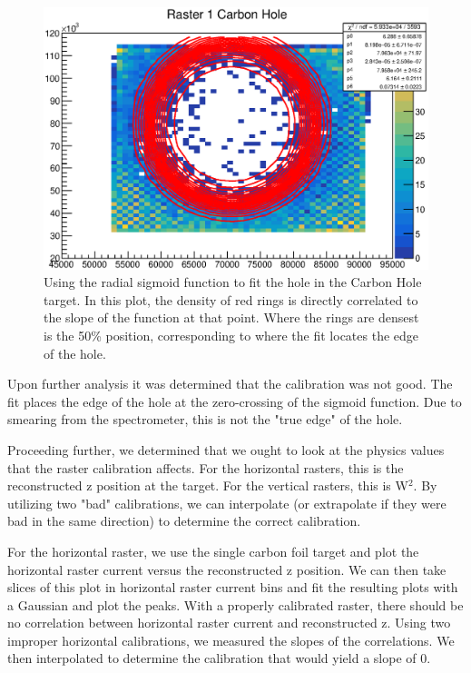 \begin{figure}
	\includegraphics[width=\textwidth]{./chap3-analysis/fig/final_chole_fit.eps}
	\caption{Using the radial sigmoid function to fit the hole in the Carbon Hole target. In this plot, the density of red rings is directly correlated to the slope of the function at that point. Where the rings are densest is the 50\% position, corresponding to where the fit locates the edge of the hole.}
	\label{fig:carbholefit}
\end{figure}

Upon further analysis it was determined that the calibration was not good. The fit places the edge of the hole at the zero-crossing of the sigmoid function. Due to smearing from the spectrometer, this is not the "true edge" of the hole.

Proceeding further, we determined that we ought to look at the physics values that the raster calibration affects. For the horizontal rasters, this is the reconstructed z position at the target. For the vertical rasters, this is W$^2$. By utilizing two "bad" calibrations, we can interpolate (or extrapolate if they were bad in the same direction) to determine the correct calibration.

For the horizontal raster, we use the single carbon foil target and plot the horizontal raster current versus the reconstructed z position. We can then take slices of this plot in horizontal raster current bins and fit the resulting plots with a Gaussian and plot the peaks. With a properly calibrated raster, there should be no correlation between horizontal raster current and reconstructed z. Using two improper horizontal calibrations, we measured the slopes of the correlations. We then interpolated to determine the calibration that would yield a slope of 0.


